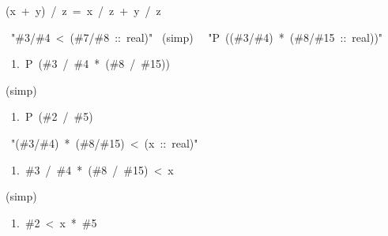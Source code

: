 \begin{isabelle}
\begin{isamarkuptext}
\begin{isabelle}
(x\ +\ y)\ /\ z\ =\ x\ /\ z\ +\ y\ /\ z%
\end{isabelle}
\end{isamarkuptext}
\ "\#3/\#4\ <\ (\#7/\#8\ ::\ real)"\isanewline
{}\ (simp)\ \isanewline
\isanewline
{}\ "P\ ((\#3/\#4)\ *\ (\#8/\#15\ ::\ real))"
\begin{isamarkuptxt}
\begin{isabelle}
\ 1.\ P\ (\#3\ /\ \#4\ *\ (\#8\ /\ \#15))
\end{isabelle}
\end{isamarkuptxt}
(simp)
\begin{isamarkuptxt}
\begin{isabelle}
\ 1.\ P\ (\#2\ /\ \#5)
\end{isabelle}
\end{isamarkuptxt}
\isanewline
\isanewline
{}\ "(\#3/\#4)\ *\ (\#8/\#15)\ <\ (x\ ::\ real)"
\begin{isamarkuptxt}
\begin{isabelle}
\ 1.\ \#3\ /\ \#4\ *\ (\#8\ /\ \#15)\ <\ x%
\end{isabelle}
\end{isamarkuptxt}
(simp)
\begin{isamarkuptxt}
\begin{isabelle}
\ 1.\ \#2\ <\ x\ *\ \#5
\end{isabelle}
\end{isamarkuptxt}
\isanewline
\isanewline
\isanewline
\isanewline
{}\isanewline
\end{isabelle}
